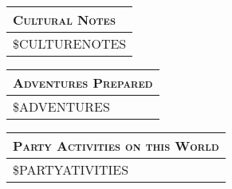 \documentclass[12pt,letterpaper,twocolumn]{article}
\begin{document}
\begin{tabularx}{\linewidth}{| X |}
    \multicolumn{1}{l}{\textsc{Cultural Notes}} \\
    \hline
    \$CULTURENOTES \\
    \hline
\end{tabularx}

\begin{tabularx}{\linewidth}{| X |}
    \multicolumn{1}{l}{\textsc{Adventures Prepared}} \\
    \hline
    \$ADVENTURES \\
    \hline
\end{tabularx}

\begin{tabularx}{\linewidth}{| X |}
    \multicolumn{1}{l}{\textsc{Party Activities on this World}} \\
    \hline
    \$PARTYATIVITIES \\
    \hline
\end{tabularx}
\end{document}
